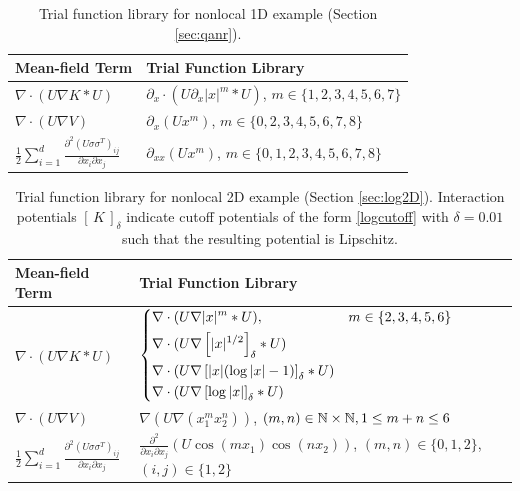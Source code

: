 \documentclass[english,reqno]{amsart}
\begin{document}
\begin{table}
\begin{center}
\begin{tabular}{|l|l|}
\hline
Mean-field Term & Trial Function Library  \\\hline
$\nabla \cdot(U\nabla K*U)$ & $\partial_x \cdot(U\partial_x  |x|^m*U)$, $m\in \{1,2,3,4,5,6,7\}$ \\ \hline
$\nabla \cdot(U\nabla V)$ & $\partial_x \left(U x^m \right)$, $m\in \{0,2,3,4,5,6,7,8\}$ \\ \hline
$\frac{1}{2}\sum_{i=1}^d \frac{\partial^2(U\sigma\sigma^T)_{ij}}{\partial x_i\partial x_j}$ & $\partial_{xx} (Ux^m)$, $m\in\{0,1,2,3,4,5,6,7,8\}$  \\ \hline
\end{tabular}
\end{center}
\caption{Trial function library for nonlocal 1D example (Section \ref{sec:qanr}).}\label{qanrlib}
\end{table}

\begin{table}
\begin{center}
\begin{tabular}{|l|l|}
\hline
Mean-field Term & Trial Function Library  \\\hline
$\nabla \cdot(U\nabla K*U)$ & $\begin{dcases} \nabla \cdot(U\nabla  |x|^m*U), & m\in \{2,3,4,5,6\} \\ \nabla \cdot(U\nabla  \left[|x|^{1/2}\right]_\delta*U) \\
\nabla \cdot(U\nabla  \left[|x|(\log|x|-1)\right]_\delta*U)\\
\nabla \cdot(U\nabla  \left[\log|x|\right]_\delta*U)\\
\end{dcases}$\\ \hline
$\nabla \cdot(U\nabla V)$ & $\nabla \left(U \nabla (x_1^mx_2^n) \right)$, $(m,n)\in\mathbb{N}\times\mathbb{N}, 1\leq m+n\leq 6$ \\ \hline
$\frac{1}{2}\sum_{i=1}^d \frac{\partial^2(U\sigma\sigma^T)_{ij}}{\partial x_i\partial x_j}$ & $\frac{\partial^2}{\partial x_i\partial x_j}(U\cos(m x_1)\cos(n x_2))$, $(m,n)\in\{0,1,2\}$,\,$(i,j)\in\{1,2\}$ \\ \hline
\end{tabular}
\end{center}
\caption{Trial function library for nonlocal 2D example (Section \ref{sec:log2D}). Interaction potentials $[\,K\,]_\delta$ indicate cutoff potentials of the form \eqref{logcutoff} with $\delta=0.01$ such that the resulting potential is Lipschitz.}\label{coslib}
\end{table}
\end{document}
